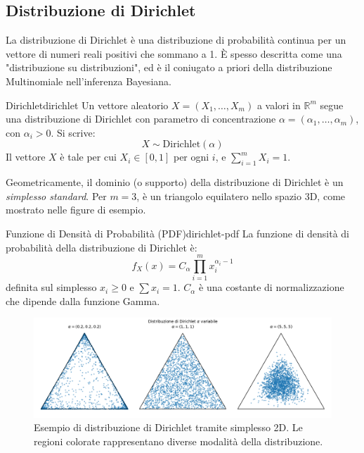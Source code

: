 \subsection{Distribuzione di Dirichlet}

La distribuzione di Dirichlet è una distribuzione di probabilità continua per
un vettore di numeri reali positivi che sommano a 1. È spesso descritta come
una "distribuzione su distribuzioni", ed è il coniugato a priori della
distribuzione Multinomiale nell'inferenza Bayesiana.

\begin{definizione}{Dirichlet}{dirichlet}
Un vettore aleatorio $X = (X_1, \dots, X_m)$ a valori in $\mathbb{R}^m$ segue
una distribuzione di Dirichlet con parametro di concentrazione $\alpha =
(\alpha_1, \dots, \alpha_m)$, con $\alpha_i > 0$. Si scrive:
$$
X \sim \text{Dirichlet}(\alpha)
$$
Il vettore $X$ è tale per cui $X_i \in [0, 1]$ per ogni $i$, e $\sum_{i=1}^{m}
X_i = 1$.
\end{definizione}

Geometricamente, il dominio (o supporto) della distribuzione di Dirichlet è un
\textit{simplesso standard}. Per $m=3$, è un triangolo equilatero nello spazio
3D, come mostrato nelle figure di esempio.

\begin{proposizione}{Funzione di Densità di Probabilità (PDF)}{dirichlet-pdf}
La funzione di densità di probabilità della distribuzione di Dirichlet è:
$$
f_X(x) = C_\alpha \prod_{i=1}^{m} x_i^{\alpha_i - 1}
$$
definita sul simplesso $x_i \ge 0$ e $\sum x_i = 1$. $C_\alpha$ è una costante
di normalizzazione che dipende dalla funzione Gamma.
\end{proposizione}


\begin{figure}[H]
    \centering
    \includegraphics[width=\textwidth]{images/th_10_12/dirichlet.png}
    \caption{Esempio di distribuzione di Dirichlet tramite simplesso 2D. Le regioni colorate rappresentano diverse modalità della distribuzione.}
    \label{fig:dirichlet}
\end{figure}

